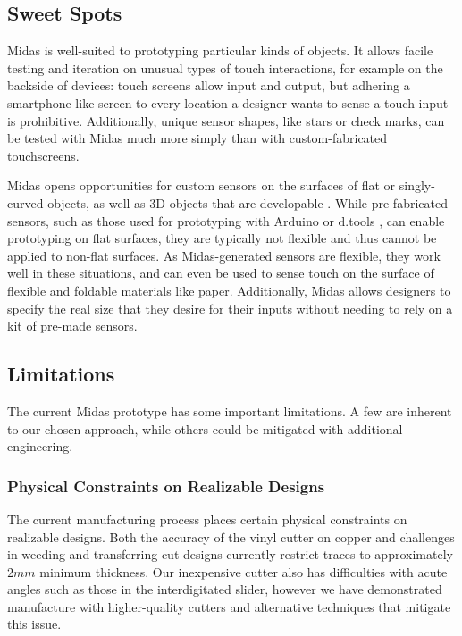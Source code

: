     \subsection{Sweet Spots}
    
    Midas is well-suited to prototyping particular kinds of objects. It allows facile testing and iteration on unusual types of touch interactions, for example on the backside of devices: touch screens allow input and output, but adhering a smartphone-like screen to every location a designer wants to sense a touch input is prohibitive. Additionally, unique sensor shapes, like stars or check marks, can be tested with Midas much more simply than with custom-fabricated touchscreens.
    
    Midas opens opportunities for custom sensors on the surfaces of flat or singly-curved objects, as well as 3D objects that are developable \cite{dutton-developable}. While pre-fabricated sensors, such as those used for prototyping with Arduino \cite{arduino} or d.tools \cite{hartmann-dtools}, can enable prototyping on flat surfaces, they are typically not flexible and thus cannot be applied to non-flat surfaces. As Midas-generated sensors are flexible, they work well in these situations, and can even be used to sense touch on the surface of flexible and foldable materials like paper. Additionally, Midas allows designers to specify the real size that they desire for their inputs without needing to rely on a kit of pre-made sensors.

    \subsection{Limitations}
    
    The current Midas prototype has some important limitations. A few are inherent to our chosen approach, while others could be mitigated with additional engineering.

\subsubsection{Physical Constraints on Realizable Designs}
The current manufacturing process places certain physical constraints on realizable designs. Both the accuracy of the vinyl cutter on copper and challenges in weeding and transferring cut designs currently restrict traces to approximately $2mm$ minimum thickness. Our inexpensive cutter also has difficulties with acute angles such as those in the interdigitated slider, however we have demonstrated manufacture with higher-quality cutters and alternative techniques that mitigate this issue.

